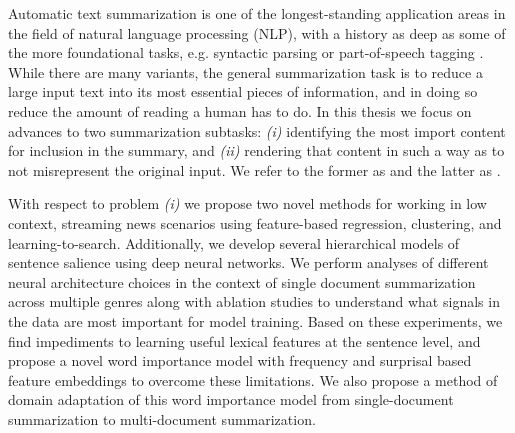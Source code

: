 Automatic text summarization is one of the longest-standing 
application areas in the 
field of natural language processing (NLP), with a history as deep 
as some of the more foundational tasks, e.g. syntactic parsing 
\citep{yngve1955syntax} or 
part-of-speech tagging \citep{harris1962string}. 
While there are many variants, 
the general summarization task is 
to reduce a large input text into its most essential pieces of information,
and in doing so reduce the amount of reading a human has to do. 
In this thesis we focus on advances to two summarization subtasks:
\textit{(i)} identifying the most import content for inclusion in the summary, 
and \textit{(ii)}
rendering that content in such a way as to not misrepresent the original 
input. We refer to the former as  and the latter
as . 

With respect to problem \textit{(i)}
we propose two novel methods for working in low context, streaming
news scenarios using feature-based regression, clustering, and 
learning-to-search. Additionally, we develop several hierarchical models
of sentence salience using deep neural networks. We perform
analyses of different neural architecture choices in the context of 
single document summarization across multiple genres along with ablation
studies to understand what signals in the data are most important for
model training. Based on these experiments, we find impediments to learning 
useful lexical features at the sentence level, 
and propose a novel word importance model
with frequency and surprisal based feature embeddings to overcome these 
limitations. We also propose a method of domain adaptation of this word 
importance model 
from single-document summarization to multi-document summarization.


